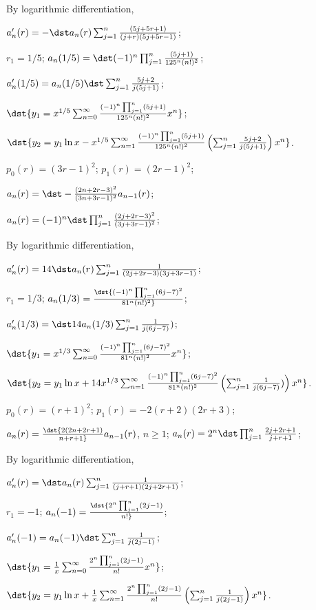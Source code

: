 \documentclass[dvips]{book}
\renewcommand{\exer}[1]{\par\medskip\;\noindent{\color{red}\bf #1.}}
\numberwithin{example}{section}
\numberwithin{equation}{section}
\numberwithin{theorem}{section}
\numberwithin{table}{section}
\numberwithin{figure}{section}
\begin{document}
By logarithmic differentiation,

$a_n'(r)=-\dst a_n(r)\sum_{j=1}^n{(5j+5r+1)\over(j+r)(5j+5r-1)}$;

$r_1=1/5$;
$a_n(1/5)=\dst(-1)^n\prod_{j=1}^n{(5j+1)\over125^n(n!)^2}$;

$a_n'(1/5)=a_n(1/5)\dst
\sum_{j=1}^n{5j+2\over j(5j+1)}$;

$\dst{y_1=x^{1/5}\sum_{n=0}^\infty{(-1)^n\prod_{j=1}^n(5j+1)\over
125^n(n!)^2} x^n}$;

$\dst{y_2=
y_1\ln
x-x^{1/5}\sum_{n=1}^\infty{(-1)^n\prod_{j=1}^n(5j+1)\over125^n(n!)^2}
\left(\sum_{j=1}^n{5j+2\over j(5j+1)}\right)x^n}$.


\exer{7.6.18}
$p_0(r)=(3r-1)^2$;
$p_1(r)=(2r-1)^2$;

$a_n(r)=\dst-{(2n+2r-3)^2\over(3n+3r-1)^2}a_{n-1}(r)$;

 $a_n(r)=(-1)^n\dst\prod_{j=1}^n{(2j+2r-3)^2\over(3j+3r-1)^2}$;

By logarithmic differentiation,

$a_n'(r)=14\dst a_n(r)\sum_{j=1}^n{1\over(2j+2r-3)(3j+3r-1)}$;

$r_1=1/3$;
$a_n(1/3)=\dst{(-1)^n\prod_{j=1}^n(6j-7)^2\over81^n(n!)^2}$;

$a_n'(1/3)=\dst14a_n(1/3)
\sum_{j=1}^n{1\over j(6j-7)})$;

$\dst{y_1=x^{1/3}\sum_{n=0}^\infty{(-1)^n\prod_{j=1}^n(6j-7)^2\over
81^n(n!)^2}
x^n}$;

$\dst{y_2=y_1\ln
x+14x^{1/3}\sum_{n=1}^\infty{(-1)^n\prod_{j=1}^n(6j-7)^2\over
81^n(n!)^2}\left(\sum_{j=1}^n{1\over j(6j-7)})\right)x^n}$.


\exer{7.6.20}
$p_0(r)=(r+1)^2$;
$p_1(r)=-2(r+2)(2r+3)$;

$a_n(r)=\dst{2(2n+2r+1)\over n+r+1}
a_{n-1}(r)$, $n\ge1$;
 $a_n(r)=2^n\dst\prod_{j=1}^n{2j+2r+1\over j+r+1}$;

By logarithmic differentiation,

$a_n'(r)=\dst a_n(r)\sum_{j=1}^n{1\over(j+r+1)(2j+2r+1)}$;

$r_1=-1$;
$a_n(-1)=\dst{2^n\prod_{j=1}^n(2j-1)\over n!}$;

$a_n'(-1)=a_n(-1)\dst\sum_{j=1}^n{1\over j(2j-1)}$;

$\dst{y_1={1\over x}\sum_{n=0}^\infty {2^n\prod_{j=1}^n(2j-1)\over n!}
x^n}$;

$\dst{y_2=y_1\ln
x+{1\over x}\sum_{n=1}^\infty{2^n\prod_{j=1}^n(2j-1)\over n!}
\left(\sum_{j=1}^n{1\over j(2j-1)}\right)x^n}$.
\end{document}
